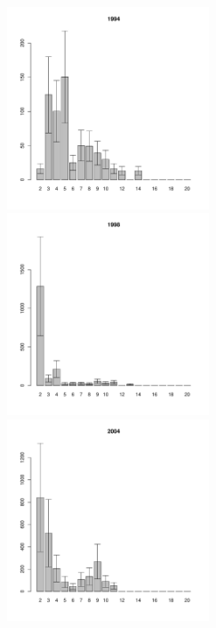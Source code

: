 \begin{figure}[hp]
	\begin{minipage}[b]{.3\linewidth}
	\begin{center}
	\includegraphics[width=60mm]{../White_Sea/Luvenga_II_razrez/high_beatch2_1994_.pdf}
	\end{center}
	\end{minipage}
	\hfill
	\begin{minipage}[b]{.3\linewidth}
	\begin{center}
	\includegraphics[width=60mm]{../White_Sea/Luvenga_II_razrez/high_beatch2_1998_.pdf}
	\end{center}
	\end{minipage}	
	\hfill
	\begin{minipage}[b]{.3\linewidth}
	\begin{center}
	\includegraphics[width=60mm]{../White_Sea/Luvenga_II_razrez/high_beatch2_2004_.pdf}
	\end{center}
	\end{minipage}


\end{figure}
